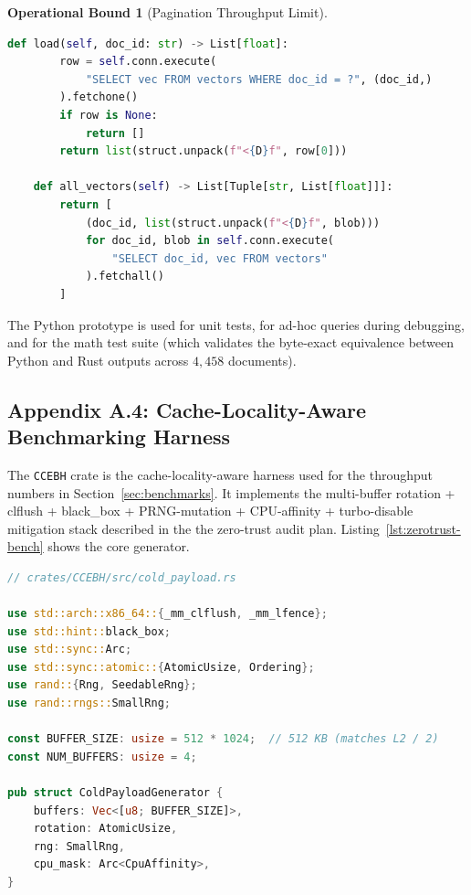 \documentclass[10pt,twocolumn]{article}
\theoremstyle{definition}
\newtheorem{operationalbound}[theorem]{Operational Bound}
\theoremstyle{remark}
\begin{document}
\begin{operationalbound}[Pagination Throughput Limit]
\begin{lstlisting}[language=Python, caption={Pure-stdlib Python
prototype \texttt{rademacher\_embedder.py}: FNV-1a + bigram +
L2-normalize + cosine.},label={lst:vector-embed}]
    def load(self, doc_id: str) -> List[float]:
        row = self.conn.execute(
            "SELECT vec FROM vectors WHERE doc_id = ?", (doc_id,)
        ).fetchone()
        if row is None:
            return []
        return list(struct.unpack(f"<{D}f", row[0]))

    def all_vectors(self) -> List[Tuple[str, List[float]]]:
        return [
            (doc_id, list(struct.unpack(f"<{D}f", blob)))
            for doc_id, blob in self.conn.execute(
                "SELECT doc_id, vec FROM vectors"
            ).fetchall()
        ]
\end{lstlisting}

The Python prototype is used for unit tests, for ad-hoc queries during
debugging, and for the math test suite (which validates the
byte-exact equivalence between Python and Rust outputs across $4{,}458$
documents).

\subsection{Appendix A.4: Cache-Locality-Aware Benchmarking Harness}
\label{app:zerotrust-bench}

The \texttt{CCEBH} crate is the cache-locality-aware
harness used for the throughput numbers in Section~\ref{sec:benchmarks}.
It implements the multi-buffer rotation + clflush + black\_box +
PRNG-mutation + CPU-affinity + turbo-disable mitigation stack described
in the the zero-trust audit plan. Listing~\ref{lst:zerotrust-bench} shows the core
generator.

\begin{lstlisting}[language=Rust, caption={Cache-locality-aware
\texttt{ColdPayloadGenerator} from \texttt{CCEBH}.
Mitigations: multi-buffer rotation, \texttt{clflush},
\texttt{black\_box}, \texttt{SmallRng} entropy, CPU affinity.},label={lst:zerotrust-bench}]
// crates/CCEBH/src/cold_payload.rs

use std::arch::x86_64::{_mm_clflush, _mm_lfence};
use std::hint::black_box;
use std::sync::Arc;
use std::sync::atomic::{AtomicUsize, Ordering};
use rand::{Rng, SeedableRng};
use rand::rngs::SmallRng;

const BUFFER_SIZE: usize = 512 * 1024;  // 512 KB (matches L2 / 2)
const NUM_BUFFERS: usize = 4;

pub struct ColdPayloadGenerator {
    buffers: Vec<[u8; BUFFER_SIZE]>,
    rotation: AtomicUsize,
    rng: SmallRng,
    cpu_mask: Arc<CpuAffinity>,
}


\end{lstlisting}
\end{operationalbound}
\end{document}
